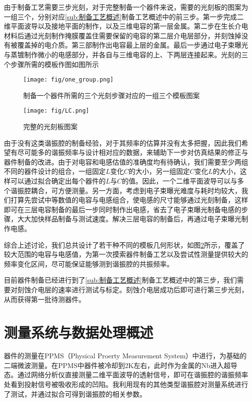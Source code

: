             由于制备工艺需要三步光刻，对于完整制备一个器件来说，需要的光刻板的图案为一组三个，分别对应\ref{sub:制备工艺概述}制备工艺概述中的前三步。第一步完成二维平面波导以及接地平面的制作，以及三维电容的第一层金属。第二步在生长介电材料后通过光刻制作掩膜覆盖住需要保留的电容的第二层介电层部分，并刻蚀掉没有被覆盖掉的电介质。第三部制作出电容最上层的金属。最后一步通过电子束曝光与蒸镀制作微小的电感部分，并各自与三维电容的上、下两层连接起来。光刻的三个步骤所需的模板作图如图所示
            

            \begin{figure}
                \texttt{[image: fig/one\_group.png]}
                \caption{制备一个器件所需的三个光刻步骤对应的一组三个模板图案}
                \label{fig:one_group}
            \end{figure}

            \begin{figure}
                \texttt{[image: fig/LC.png]}
                \caption{完整的光刻板图案}
                \label{fig:LC}
            \end{figure}

            由于没有这类谐振腔的制备经验，对于其频率的估算并没有太多把握，因此我们希望有尽可能多的谐振频率与设计相对应的数据，来辅助下一步对仿真结果的修正与器件制备的改进。由于对电容和电感估值的准确度均有待确认，我们需要至少两组不同的器件设计的组合，一组固定$L$变化$C$的大小，另一组固定$C$变化$L$的大小，这样可以通过拟合确定出每个器件的$L$与$C$的值。因此，一个二维平面波导可以与多个谐振腔耦合，可方便测量。另一方面，考虑到电子束曝光难度与耗时均较大，我们打算先尝试中等数值的电容与电感组合，使电感的尺寸能够通过光刻制备，这样即可在三层电容制备的最后一步同时制作出电感，省去了电子束曝光制备电感的步骤，大大加快样品制备与测试速度。解决三层电容的制备后，再通过电子束曝光制作电感。

            综合上述讨论，我们总共设计了若干种不同的模板几何形状，如图\ref{fig:LC}所示，覆盖了较大范围的电容与电感值，为第一次摸索器件制备工艺以及尝试性测量提供较大的频率变化区间，尽可能保证能够测到谐振腔的共振频率。

            目前器件制备已经进行到了\ref{sub:制备工艺概述}制备工艺概述中的第三步，我们需要对刻蚀介电层的速率进行测试与标定。刻蚀介电层成功后即可进行第三步光刻，从而获得第一批待测器件。
            



        \section{测量系统与数据处理概述} %
        \label{sec:测量系统与数据处理概述}
            器件的测量在PPMS（Physical Proerty Measurement System）中进行，为基础的二端微波测量。在PPMS中器件被冷却到2K左右，此时作为金属的Nb进入超导态。通过网络分析仪直接测量二维平面波导的透射信号，即可在谐振腔的谐振频率处看到投射信号被吸收形成的凹陷。我利用现有的其他类型谐振腔对测量系统进行了测试，并通过拟合可得到谐振腔的相关参数\cite{Khalil2012}。






